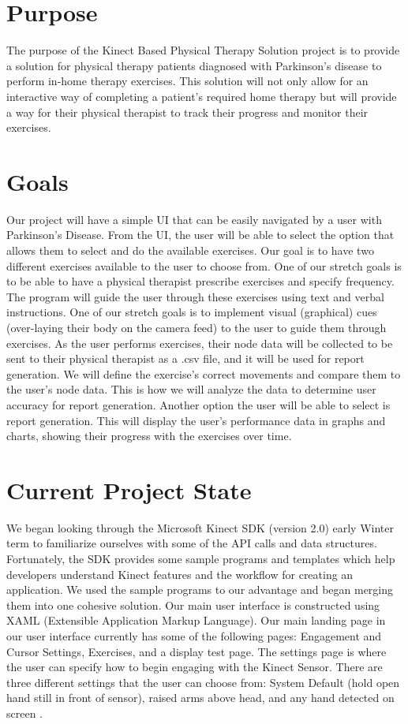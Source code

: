 \documentclass[onecolumn, draftclsnofoot,10pt, compsoc]{IEEEtran}
\begin{document}
\section{Purpose}
The purpose of the Kinect Based Physical Therapy Solution project is to provide a solution for physical therapy patients diagnosed with Parkinson's disease to perform in-home therapy exercises. This solution will not only allow for an interactive way of completing a patient's required home therapy but will provide a way for their physical therapist to track their progress and monitor their exercises.

\section{Goals}
Our project will have a simple UI that can be easily navigated by a user with Parkinson's Disease. From the UI, the user will be able to select the option that allows them to select and do the available exercises. Our goal is to have two different exercises available to the user to choose from. One of our stretch goals is to be able to have a physical therapist prescribe exercises and specify frequency. The program will guide the user through these exercises using text and verbal instructions. One of our stretch goals is to implement visual (graphical) cues (over-laying their body on the camera feed) to the user to guide them through exercises. As the user performs exercises, their node data will be collected to be sent to their physical therapist as a .csv file, and it will be used for report generation. We will define the exercise's correct movements and compare them to the user's node data. This is how we will analyze the data to determine user accuracy for report generation. Another option the user will be able to select is report generation. This will display the user's performance data in graphs and charts, showing their progress with the exercises over time. 

\section{Current Project State}
We began looking through the Microsoft Kinect SDK (version 2.0) early Winter term to familiarize ourselves with some of the API calls and data structures. Fortunately, the SDK provides some sample programs and templates which help developers understand Kinect features and the workflow for creating an application. We used the sample programs to our advantage and began merging them into one cohesive solution. Our main user interface is constructed using XAML (Extensible Application Markup Language). Our main landing page in our user interface currently has some of the following pages: Engagement and Cursor Settings, Exercises, and a display test page. The settings page is where the user can specify how to begin engaging with the Kinect Sensor. There are three different settings that the user can choose from: System Default (hold open hand still in front of sensor), raised arms above head, and any hand detected on screen \cite{KinectDevelop}.
\end{document}
